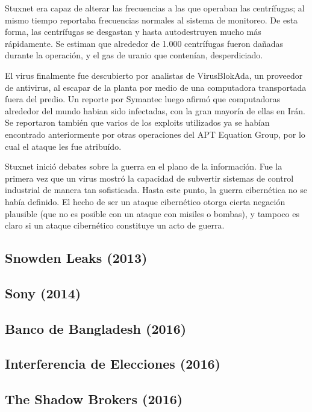 \documentclass{article}
\begin{document}
Stuxnet era capaz de alterar las frecuencias a las que operaban las centrífugas; al mismo tiempo reportaba frecuencias normales al sistema de monitoreo. De esta forma, las centrífugas se desgastan y hasta autodestruyen mucho más rápidamente. Se estiman que alrededor de 1.000 centrífugas fueron dañadas durante la operación, y el gas de uranio que contenían, desperdiciado. \autocite{zetter-stuxnet} \autocite{washingtonpost-stuxnet}

El virus finalmente fue descubierto por analistas de VirusBlokAda, un proveedor de antivirus, al escapar de la planta por medio de una computadora transportada fuera del predio. Un reporte por Symantec luego afirmó que computadoras alrededor del mundo habian sido infectadas, con la gran mayoría de ellas en Irán. Se reportaron también que varios de los exploits utilizados ya se habían encontrado anteriormente por otras operaciones del APT Equation Group, por lo cual el ataque les fue atribuído. \autocite{infoworld-stuxnet} 

Stuxnet inició debates sobre la guerra en el plano de la información. Fue la primera vez que un virus mostró la capacidad de subvertir sistemas de control industrial de manera tan sofisticada. Hasta este punto, la guerra cibernética no se había definido. El hecho de ser un ataque cibernético otorga cierta negación plausible (que no es posible con un ataque con misiles o bombas), y tampoco es claro si un ataque cibernético constituye un acto de guerra. \autocite{washingtonpost-stuxnet-2} \autocite{darknetdiaries-stuxnet}

\subsection{Snowden Leaks (2013)}

\subsection{Sony (2014)}

\subsection{Banco de Bangladesh (2016)}

\subsection{Interferencia de Elecciones (2016)}

\subsection{The Shadow Brokers (2016)}
\end{document}
